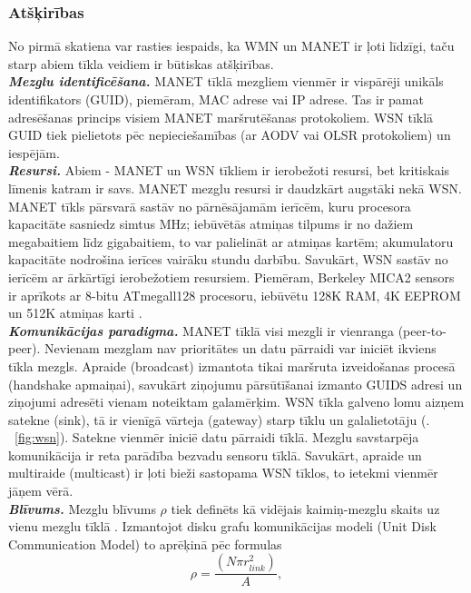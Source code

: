 \subsubsection{Atšķirības}
No pirmā skatiena var rasties iespaids, ka WMN un MANET ir ļoti līdzīgi, taču starp abiem tīkla veidiem ir būtiskas atšķirības.\\
\small\textbf{\textit{Mezglu identificēšana.}} MANET tīklā mezgliem vienmēr ir vispārēji unikāls identifikators (\acs{GUID}), piemēram, MAC adrese vai IP adrese. Tas ir pamat adresēšanas princips visiem MANET maršrutēšanas protokoliem. WSN tīklā GUID tiek pielietots pēc nepieciešamības (ar AODV vai OLSR protokoliem) un iespējām.\\
\small\textbf{\textit{Resursi.}} Abiem - MANET un WSN tīkliem ir ierobežoti resursi, bet kritiskais līmenis katram ir savs. MANET mezglu resursi ir daudzkārt augstāki nekā WSN. MANET tīkls pārsvarā sastāv no pārnēsājamām ierīcēm, kuru procesora kapacitāte sasniedz simtus MHz; iebūvētās atmiņas tilpums ir no dažiem megabaitiem līdz gigabaitiem, to var palielināt ar atmiņas kartēm; akumulatoru kapacitāte nodrošina ierīces vairāku stundu darbību. Savukārt, WSN sastāv no ierīcēm ar ārkārtīgi ierobežotiem resursiem. Piemēram, Berkeley MICA2 sensors ir aprīkots ar 8-bitu ATmegall128 procesoru, iebūvētu 128K RAM, 4K EEPROM un 512K atmiņas karti \cite{Proc13}.\\
\small\textbf{\textit{Komunikācijas paradigma.}} MANET tīklā visi mezgli ir vienranga (peer-to-peer). Nevienam mezglam nav prioritātes un datu pārraidi var iniciēt ikviens tīkla mezgls. Apraide (broadcast) izmantota tikai maršruta izveidošanas procesā (handshake apmaiņai), savukārt ziņojumu pārsūtīšanai izmanto GUIDS adresi un ziņojumi adresēti vienam noteiktam galamērķim. WSN tīkla galveno lomu aizņem satekne (sink), tā ir vienīgā vārteja (gateway) starp tīklu un galalietotāju (\figurename. ~\ref{fig:wsn}). Satekne vienmēr iniciē datu pārraidi tīklā. Mezglu savstarpēja komunikācija ir reta parādība bezvadu sensoru tīklā. Savukārt, apraide un multiraide (multicast) ir ļoti bieži sastopama WSN tīklos, to ietekmi vienmēr jāņem vērā.\\
\small\textbf{\textit{Blīvums.}} Mezglu blīvums $\rho$ tiek definēts kā vidējais kaimiņ-mezglu skaits uz vienu mezglu tīklā \cite{NSsurvey}. Izmantojot disku grafu komunikācijas modeli (Unit Disk Communication Model) to aprēķinā pēc formulas \cite{perkinsBook}
\begin{equation}
\rho=\frac{(N\pi r_{link}^2)}{A} ,
\label{eq:blivums}
\end{equation}
